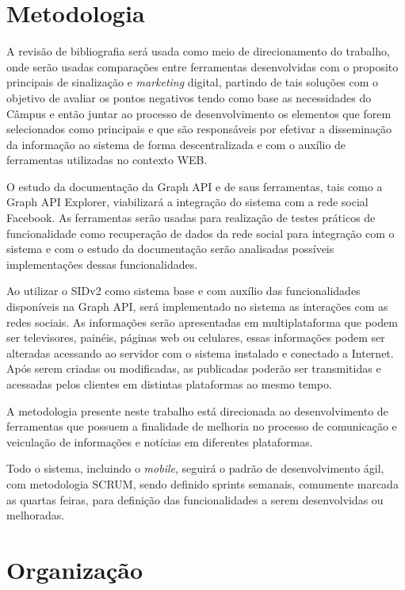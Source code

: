 \section{Metodologia}
A revisão de bibliografia será usada como meio de direcionamento do trabalho, onde serão usadas comparações entre ferramentas desenvolvidas com o proposito principais de sinalização e \textit{marketing} digital, partindo de tais soluções com o objetivo de avaliar os pontos negativos tendo como base as necessidades do Câmpus e então juntar ao processo de desenvolvimento os elementos que forem selecionados como principais e que são responsáveis por efetivar a disseminação da informação ao sistema de forma descentralizada e com o auxílio de ferramentas utilizadas no contexto WEB.

O estudo da documentação da Graph API e de saus ferramentas, tais como a Graph API Explorer, viabilizará a integração do sistema com a rede social Facebook. As ferramentas serão usadas para realização de testes práticos de funcionalidade como recuperação de dados da rede social para integração com o sistema e com o estudo da documentação serão analisadas possíveis implementações dessas funcionalidades.
	 
Ao utilizar o SIDv2 como sistema base e com auxílio das funcionalidades disponíveis na Graph API, será implementado no sistema as interações com as redes sociais. As informações serão apresentadas em multiplataforma que podem ser televisores, painéis, páginas web ou celulares, essas informações podem ser alteradas acessando ao servidor com o sistema instalado e conectado a Internet. Após serem criadas ou modificadas, as publicadas poderão ser transmitidas e acessadas pelos clientes em distintas plataformas ao mesmo tempo.

A metodologia presente neste trabalho está direcionada ao desenvolvimento de ferramentas que possuem a finalidade de melhoria no processo de comunicação e veiculação de informações e notícias em diferentes plataformas. 

Todo o sistema, incluindo o \textit{mobile}, seguirá o padrão de desenvolvimento ágil, com metodologia SCRUM, sendo definido sprints semanais, comumente marcada as quartas feiras, para definição das funcionalidades a serem desenvolvidas ou melhoradas. 

\section{Organização}
